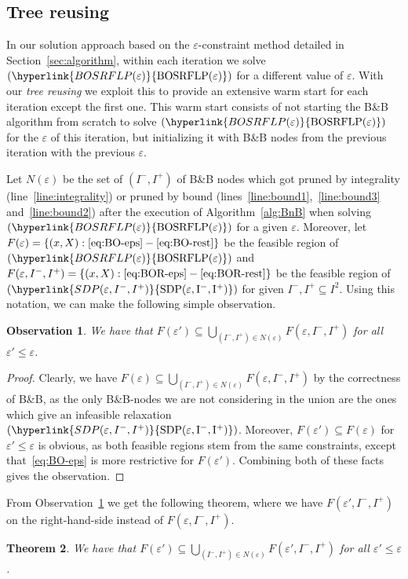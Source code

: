 \documentclass{article}
\newcommand{\myrefmath}[1]{(\hyperlink{#1}{\mathrm{#1}})}
\newcommand{\BB}{B\&B\xspace}
\newtheorem{theorem}{Theorem}
\newtheorem{observation}[theorem]{Observation}
\begin{document}
\subsection{Tree reusing}\label{sec:tree}
In our solution approach based on the $\varepsilon$-constraint method detailed in Section~\ref{sec:algorithm}, within each iteration we solve $\myrefmath{BOSRFLP(\varepsilon)}$ for a different value of $\varepsilon$. 
With our \emph{tree reusing} we exploit this 
to provide an extensive warm start for each iteration except the first one. This warm start consists of not starting the \BB algorithm from scratch to solve $\myrefmath{BOSRFLP(\varepsilon)}$ for the $\varepsilon$ of this iteration, but initializing it with \BB nodes from the previous iteration with the previous $\varepsilon$. 

Let $N(\varepsilon)$ be the set of $(I^-,I^+)$ of \BB nodes which got pruned by integrality (line~\ref{line:integrality}) or pruned by bound (lines~\ref{line:bound1},~\ref{line:bound3} and~\ref{line:bound2}) after the execution of Algorithm~\ref{alg:BnB} when solving $\myrefmath{BOSRFLP(\varepsilon)}$ for a given $\varepsilon$. Moreover, let $F(\varepsilon)=\{(x,X):\eqref{eq:BO-eps}-\eqref{eq:BO-rest} \}$ be the feasible region of $\myrefmath{BOSRFLP(\varepsilon)}$ and $F(\varepsilon,I^-,I^+)=\{(x,X):\eqref{eq:BOR-eps}-\eqref{eq:BOR-rest}\}$ be the feasible region of $\myrefmath{SDP(\varepsilon,I^-,I^+)}$ for given $I^-,I^+ \subseteq I^2$. Using this notation, we can make the following simple observation.

\begin{observation}\label{ob:obseps}
    We have that $F(\varepsilon') \subseteq \bigcup_{(I^-,I^+) \in N(\varepsilon)} F(\varepsilon,I^-,I^+) $ for all $\varepsilon'\leq \varepsilon$.
\end{observation}
\begin{proof}
Clearly, we have $F(\varepsilon) \subseteq \bigcup_{(I^-,I^+) \in N(\varepsilon)} F(\varepsilon,I^-,I^+)$ by the correctness of \BB, as the only \BB-nodes we are not considering in the union are the ones which give an infeasible relaxation $\myrefmath{SDP(\varepsilon,I^-,I^+)}$. Moreover, $F(\varepsilon')\subseteq F(\varepsilon)$ for $\varepsilon'\leq\varepsilon$ is obvious, as both feasible regions stem from the same constraints, except that~\eqref{eq:BO-eps} is more restrictive for $F(\varepsilon')$. Combining both of these facts gives the observation.
\end{proof}

From Observation~\ref{ob:obseps} we get the following theorem, where we have $F(\varepsilon',I^-,I^+)$ on the right-hand-side instead of $F(\varepsilon,I^-,I^+)$.
\begin{theorem}\label{thm:thmeps}
We have that $F(\varepsilon') \subseteq \bigcup_{(I^-,I^+) \in N(\varepsilon)} F(\varepsilon',I^-,I^+) $ for all $\varepsilon'\leq \varepsilon$.
\end{theorem}
\end{document}
